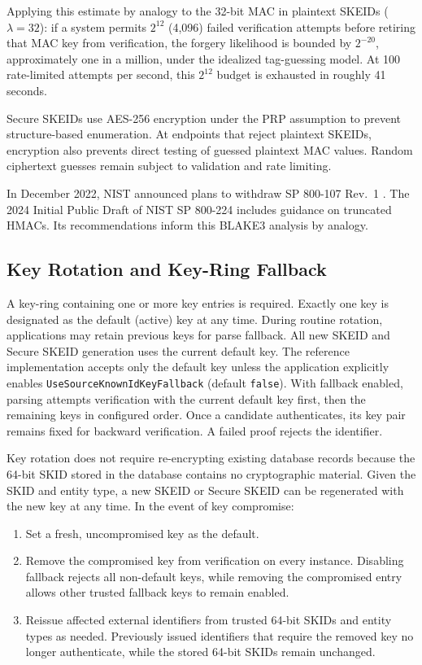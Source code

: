\documentclass[a4paper,fleqn]{cas-sc}
\providecommand{\tightlist}{%
  \setlength{\itemsep}{0pt}\setlength{\parskip}{0pt}}
\begin{document}
Applying this estimate by analogy to the 32-bit MAC in plaintext SKEIDs
(\(\lambda = 32\)): if a system permits \(2^{12}\) (4,096) failed
verification attempts before retiring that MAC key from verification,
the forgery likelihood is bounded by \(2^{-20}\), approximately one in a
million, under the idealized tag-guessing model. At 100 rate-limited
attempts per second, this \(2^{12}\) budget is exhausted in roughly 41
seconds.

Secure SKEIDs use AES-256 encryption under the PRP assumption to prevent
structure-based enumeration. At endpoints that reject plaintext SKEIDs,
encryption also prevents direct testing of guessed plaintext MAC values.
Random ciphertext guesses remain subject to validation and rate
limiting.

In December 2022, NIST announced plans to withdraw SP 800-107 Rev.~1
\citep{nistsp800107withdrawal}. The 2024 Initial Public Draft of NIST SP
800-224 \citep{nistsp800224} includes guidance on truncated HMACs. Its
recommendations inform this BLAKE3 analysis by analogy.

\subsection{Key Rotation and Key-Ring
Fallback}\label{key-rotation-and-key-ring-fallback}

A key-ring containing one or more key entries is required. Exactly one
key is designated as the default (active) key at any time. During
routine rotation, applications may retain previous keys for parse
fallback. All new SKEID and Secure SKEID generation uses the current
default key. The reference implementation accepts only the default key
unless the application explicitly enables
\texttt{UseSourceKnownIdKeyFallback} (default \texttt{false}). With
fallback enabled, parsing attempts verification with the current default
key first, then the remaining keys in configured order. Once a candidate
authenticates, its key pair remains fixed for backward verification. A
failed proof rejects the identifier.

Key rotation does not require re-encrypting existing database records
because the 64-bit SKID stored in the database contains no cryptographic
material. Given the SKID and entity type, a new SKEID or Secure SKEID
can be regenerated with the new key at any time. In the event of key
compromise:

\begin{enumerate}
\def\labelenumi{\arabic{enumi}.}
\tightlist
\item
  Set a fresh, uncompromised key as the default.
\item
  Remove the compromised key from verification on every instance.
  Disabling fallback rejects all non-default keys, while removing the
  compromised entry allows other trusted fallback keys to remain
  enabled.
\item
  Reissue affected external identifiers from trusted 64-bit SKIDs and
  entity types as needed. Previously issued identifiers that require the
  removed key no longer authenticate, while the stored 64-bit SKIDs
  remain unchanged.
\end{enumerate}
\end{document}
